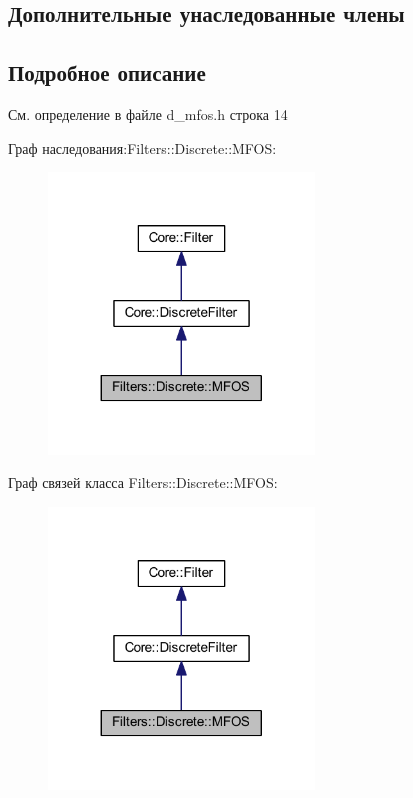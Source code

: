 \subsection*{Дополнительные унаследованные члены}


\subsection{Подробное описание}


См. определение в файле d\+\_\+mfos.\+h строка 14



Граф наследования\+:Filters\+:\+:Discrete\+:\+:M\+F\+OS\+:
\nopagebreak
\begin{figure}[H]
\begin{center}
\leavevmode
\includegraphics[width=200pt]{class_filters_1_1_discrete_1_1_m_f_o_s__inherit__graph}
\end{center}
\end{figure}


Граф связей класса Filters\+:\+:Discrete\+:\+:M\+F\+OS\+:
\nopagebreak
\begin{figure}[H]
\begin{center}
\leavevmode
\includegraphics[width=200pt]{class_filters_1_1_discrete_1_1_m_f_o_s__coll__graph}
\end{center}
\end{figure}


